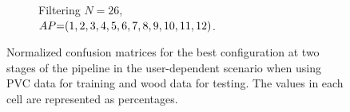 \begin{figure}[ht]
\begin{subfigure}{.49\textwidth}
    \vspace{-15pt}
    \captionsetup{width=.99\linewidth}
    \caption{Filtering $N{=}26$, \\ $\splitatcommas{AP{=}(1, 2, 3, 4, 5, 6, 7, 8, 9, 10, 11, 12)}$.}
    \label{fig:radar-experiments:through-materials:pvc-wood-confusion:filtering-ud}
  \end{subfigure}
  
  \vspace{-6pt}
  \caption{Normalized confusion matrices for the best configuration at two stages of the pipeline in the user-dependent scenario when using PVC data for training and wood data for testing. The values in each cell are represented as percentages.}
  \label{fig:radar-experiments:through-materials:pvc-wood-confusion}
\end{figure}






